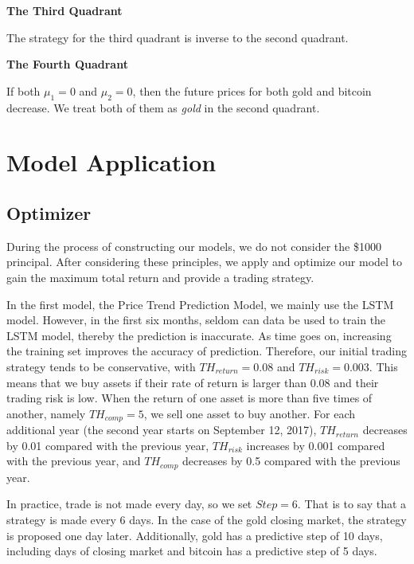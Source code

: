 \documentclass[12pt]{article}
\begin{document}
\noindent
\textbf{The Third Quadrant}

The strategy for the third quadrant is inverse to the second quadrant.

\noindent
\textbf{The Fourth Quadrant}

If both $\mu_1=0$ and $\mu_2=0$, then the future prices for both gold and bitcoin decrease. We treat both of them as \emph{gold} in the second quadrant.

\section{Model Application}
\subsection{Optimizer}
During the process of constructing our models, we do not consider the \$1000 principal. After considering these principles, we apply and optimize our model to gain the maximum total return and provide a trading strategy.

In the first model, the Price Trend Prediction Model, we mainly use the LSTM model. However, in the first six months, seldom can data be used to train the LSTM model, thereby the prediction is inaccurate. As time goes on, increasing the training set improves the accuracy of prediction. Therefore, our initial trading strategy tends to be conservative, with $TH_{return}=0.08$ and $TH_{risk}=0.003$. This means that we buy assets if their rate of return is larger than 0.08 and their trading risk is low. When the return of one asset is more than five times of another, namely $TH_{comp}=5$, we sell one asset to buy another. For each additional year (the second year starts on September 12, 2017), $TH_{return}$ decreases by 0.01 compared with the previous year, $TH_{risk}$ increases by 0.001 compared with the previous year, and $TH_{comp}$ decreases by 0.5 compared with the previous year.

In practice, trade is not made every day, so we set $Step=6$. That is to say that a strategy is made every 6 days. In the case of the gold closing market, the strategy is proposed one day later. Additionally, gold has a predictive step of 10 days, including days of closing market and bitcoin has a predictive step of 5 days.
\end{document}
